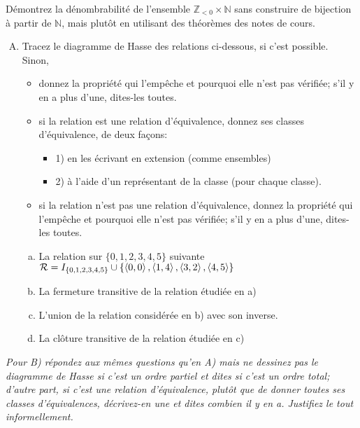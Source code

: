 \documentclass[11pt]{article}
\newcommand{\ensembleN}{{\mathbb{N}}}  %
\newcommand{\ensembleZ}{{\mathbb{Z}}}  %
\newcommand{\tuple}[1]{\ensuremath{\left\langle #1 \right\rangle}}  %
\newcounter{exercice}\newcommand{\exercice}{ \bigskip \addtocounter{exercice}{1}\noindent \textbf{Exercice \theexercice}\\}
\begin{document}
\exercice 
Démontrez la dénombrabilité  de l'ensemble $\ensembleZ_{<0}\times \ensembleN$ sans construire de bijection à partir de $\ensembleN$, mais plutôt  en utilisant des théorèmes des notes de cours. 



\exercice\vspace{-3mm}
\begin{enumerate}[A)]%
\item  Tracez le diagramme de Hasse des relations ci-dessous, si c'est possible.  Sinon, 
\begin{itemize}
\item donnez la propriété qui l'empêche et pourquoi elle n'est pas vérifiée; s'il y en a plus d'une, dites-les toutes.
\item  si la relation est une relation d'équivalence, donnez ses classes d'équivalence, de deux façons: 
\begin{itemize}%
\item 1) en les écrivant en extension (comme ensembles) 
\item 2) à l'aide d'un représentant de la classe (pour chaque classe).
\end{itemize}
\item si la relation n'est pas une relation d'équivalence, donnez la propriété qui l'empêche et pourquoi elle n'est pas vérifiée; s'il y en a plus d'une, dites-les toutes.
\end{itemize}


\begin{enumerate}[a)]%
\item  La relation sur $\{0,1,2,3,4,5\}$  suivante 
${\cal R} = I_{\{0,1,2,3,4,5\}} \cup\{  \tuple{0,0},\tuple{1,4}, \tuple{3,2},\tuple{4,5}\}$
\item La fermeture transitive de la relation étudiée en a)
\item  L'union de la relation considérée en b) avec son inverse.
\item  La clôture transitive de la relation étudiée en c)
\end{enumerate}\end{enumerate}
\noindent
\emph{Pour B) répondez aux mêmes questions qu'en A)  mais ne dessinez pas le diagramme de Hasse si c'est un ordre partiel et dites  si c'est un ordre total; d'autre part, si c'est une relation d'équivalence, plutôt que de donner toutes ses classes d'équivalences, décrivez-en une et dites combien il y en a. Justifiez le tout informellement.}
\end{document}
